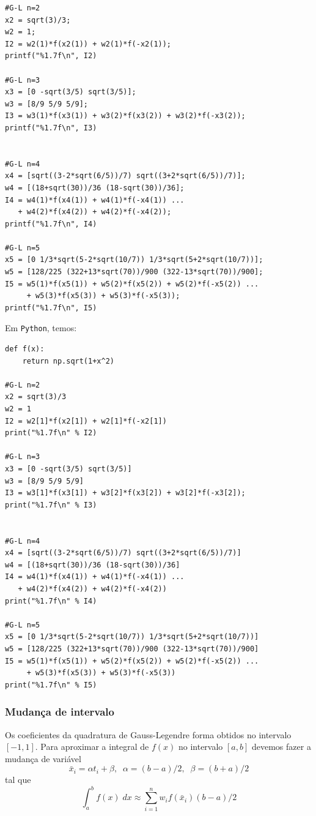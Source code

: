 \begin{sol}
\begin{verbatim}
#G-L n=2
x2 = sqrt(3)/3;
w2 = 1;
I2 = w2(1)*f(x2(1)) + w2(1)*f(-x2(1));
printf("%1.7f\n", I2)

#G-L n=3
x3 = [0 -sqrt(3/5) sqrt(3/5)];
w3 = [8/9 5/9 5/9];
I3 = w3(1)*f(x3(1)) + w3(2)*f(x3(2)) + w3(2)*f(-x3(2));
printf("%1.7f\n", I3)


#G-L n=4
x4 = [sqrt((3-2*sqrt(6/5))/7) sqrt((3+2*sqrt(6/5))/7)];
w4 = [(18+sqrt(30))/36 (18-sqrt(30))/36];
I4 = w4(1)*f(x4(1)) + w4(1)*f(-x4(1)) ...
   + w4(2)*f(x4(2)) + w4(2)*f(-x4(2));
printf("%1.7f\n", I4)

#G-L n=5
x5 = [0 1/3*sqrt(5-2*sqrt(10/7)) 1/3*sqrt(5+2*sqrt(10/7))];
w5 = [128/225 (322+13*sqrt(70))/900 (322-13*sqrt(70))/900];
I5 = w5(1)*f(x5(1)) + w5(2)*f(x5(2)) + w5(2)*f(-x5(2)) ...
     + w5(3)*f(x5(3)) + w5(3)*f(-x5(3));
printf("%1.7f\n", I5)
\end{verbatim}
\fi
\ifispython
Em \verb+Python+, temos:
\begin{verbatim}
def f(x):
    return np.sqrt(1+x^2)

#G-L n=2
x2 = sqrt(3)/3
w2 = 1
I2 = w2[1]*f(x2[1]) + w2[1]*f(-x2[1])
print("%1.7f\n" % I2)

#G-L n=3
x3 = [0 -sqrt(3/5) sqrt(3/5)]
w3 = [8/9 5/9 5/9]
I3 = w3[1]*f(x3[1]) + w3[2]*f(x3[2]) + w3[2]*f(-x3[2]);
print("%1.7f\n" % I3)


#G-L n=4
x4 = [sqrt((3-2*sqrt(6/5))/7) sqrt((3+2*sqrt(6/5))/7)]
w4 = [(18+sqrt(30))/36 (18-sqrt(30))/36]
I4 = w4(1)*f(x4(1)) + w4(1)*f(-x4(1)) ...
   + w4(2)*f(x4(2)) + w4(2)*f(-x4(2))
print("%1.7f\n" % I4)

#G-L n=5
x5 = [0 1/3*sqrt(5-2*sqrt(10/7)) 1/3*sqrt(5+2*sqrt(10/7))]
w5 = [128/225 (322+13*sqrt(70))/900 (322-13*sqrt(70))/900]
I5 = w5(1)*f(x5(1)) + w5(2)*f(x5(2)) + w5(2)*f(-x5(2)) ...
     + w5(3)*f(x5(3)) + w5(3)*f(-x5(3))
print("%1.7f\n" % I5)
\end{verbatim}
\fi
\end{sol}

\subsubsection{Mudança de intervalo}
Os coeficientes da quadratura de Gauss-Legendre forma obtidos no intervalo $[-1,1]$. Para aproximar a integral de $f(x)$ no intervalo $[a,b]$ devemos fazer a mudança de variável
$$ \bar{x}_i=\alpha t_i+ \beta , \;\; \alpha =(b-a)/2, \;\; \beta = (b+a)/2 $$
tal que
$$
 \int_{a}^{b} f(x) \; dx \approx \sum_{i=1}^n w_i f( \bar{x}_i ) (b-a)/2
$$


